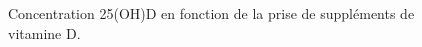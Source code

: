 \documentclass[
  a4paper,
  DIV=11,
  numbers=noendperiod,
  listof=totoc]{scrreprt}
\begin{document}
\begin{figure}

\begin{minipage}[t]{0.50\linewidth}

{\centering 


\caption{\label{fig-vd-pk-heaney}Concentration 25(OH)D en fonction de la
prise de suppléments de vitamine D. \autocite{Heaney.2015}}

}

\end{minipage}%
%
\begin{minipage}[t]{0.50\linewidth}

{\centering 

}
\end{minipage}
\end{figure}
\end{document}
